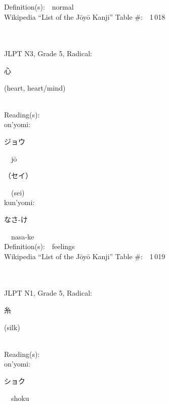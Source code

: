 \begin{multicols}{2}
Definition(s):\ \ normal \\
Wikipedia ``List of the J\=oy\=o Kanji'' Table \#:\ \ 1\,018 \\
\ \ \\
{\fontsize{34pt}{40pt}  }\ \ \\  %
{JLPT N3, Grade 5, Radical:\ \ {\begin{CJK}{UTF8}{min} 心 \end{CJK}} (heart, heart/mind) } \\
Reading(s):\ \ \\
{\hspace*{1em}}on'yomi:\ \ \\
{\hspace*{2em}}{\begin{CJK}{UTF8}{min} ジョウ \end{CJK}}\ \ j\=o\ \ \\
{\hspace*{2em}}{\begin{CJK}{UTF8}{min} （セイ） \end{CJK}}\ \ (sei)\ \ \\
{\hspace*{1em}}kun'yomi:\ \ \\
{\hspace*{2em}}{\begin{CJK}{UTF8}{min} なさ-け \end{CJK}}\ \ nasa-ke\ \ \\
Definition(s):\ \ feelings \\
Wikipedia ``List of the J\=oy\=o Kanji'' Table \#:\ \ 1\,019 \\
\ \ \\
{\fontsize{34pt}{40pt}  }\ \ \\  %
{JLPT N1, Grade 5, Radical:\ \ {\begin{CJK}{UTF8}{min} 糸 \end{CJK}} (silk) } \\
Reading(s):\ \ \\
{\hspace*{1em}}on'yomi:\ \ \\
{\hspace*{2em}}{\begin{CJK}{UTF8}{min} ショク \end{CJK}}\ \ shoku\ \ \\

\end{multicols}

